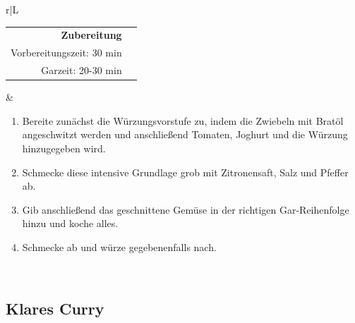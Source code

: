 \documentclass[a4paper, 12pt]{scrbook} 								%
\numberwithin{equation}{section} 									%
\begin{document}
\begin{tabularx}{\textwidth}{r|L}
				
					\begin{tabular}[t]{rr}
						\textbf{Zubereitung}	\\
						Vorbereitungszeit: 30 min	\\
						Garzeit:	20-30 min		\\
					\end{tabular}			&	\begin{enumerate}[nosep]
													\item Bereite zunächst die Würzungsvorstufe zu, indem die Zwiebeln mit Bratöl angeschwitzt werden und anschließend Tomaten, Joghurt und die Würzung hinzugegeben wird.
													\item Schmecke diese intensive Grundlage grob mit Zitronensaft, Salz und Pfeffer ab.
													\item Gib anschließend das geschnittene Gemüse in der richtigen Gar-Reihenfolge hinzu und koche alles.
													\item Schmecke ab und würze gegebenenfalls nach.
												\end{enumerate}	\\
				\end{tabularx}
				\newpage


				\subsection{Klares Curry}	\label{klares_curry}
\end{document}
